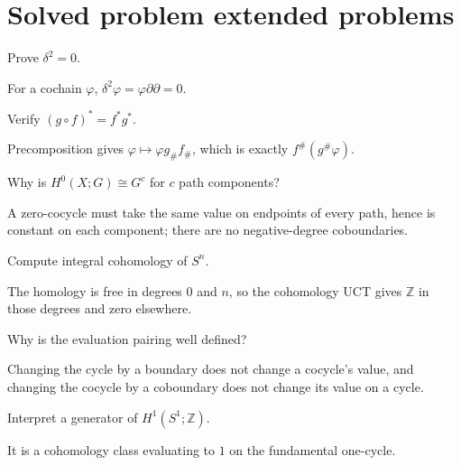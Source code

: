 \section{Solved problem extended problems}

\begin{problem}\label{prob:viii28-01}
Prove \(\delta^2=0\).
\end{problem}
\begin{solution}
For a cochain \(\varphi\), \(\delta^2\varphi=\varphi\partial\partial=0\).
\end{solution}

\begin{problem}[Contravariance]\label{prob:viii28-02}
Verify \((g\circ f)^*=f^*g^*\).
\end{problem}
\begin{solution}
Precomposition gives \(\varphi\mapsto\varphi g_\# f_\#\), which is exactly \(f^\#(g^\#\varphi)\).
\end{solution}

\begin{problem}[H0]\label{prob:viii28-03}
Why is \(H^0(X;G)\cong G^c\) for \(c\) path components?
\end{problem}
\begin{solution}
A zero-cocycle must take the same value on endpoints of every path, hence is constant on each component; there are no negative-degree coboundaries.
\end{solution}

\begin{problem}[Sphere]\label{prob:viii28-04}
Compute integral cohomology of \(S^n\).
\end{problem}
\begin{solution}
The homology is free in degrees 0 and \(n\), so the cohomology UCT gives \(\mathbb Z\) in those degrees and zero elsewhere.
\end{solution}

\begin{problem}[Kronecker]\label{prob:viii28-05}
Why is the evaluation pairing well defined?
\end{problem}
\begin{solution}
Changing the cycle by a boundary does not change a cocycle's value, and changing the cocycle by a coboundary does not change its value on a cycle.
\end{solution}

\begin{problem}\label{prob:viii28-06}
Interpret a generator of \(H^1(S^1;\mathbb Z)\).
\end{problem}
\begin{solution}
It is a cohomology class evaluating to \(1\) on the fundamental one-cycle.
\end{solution}

